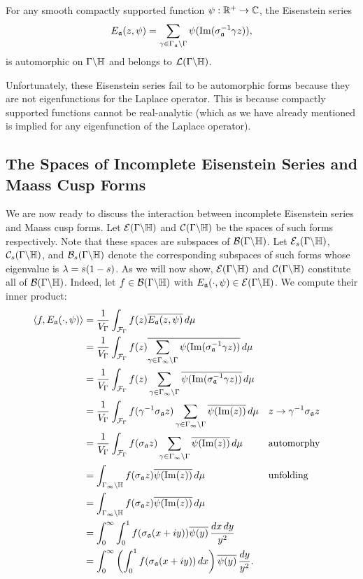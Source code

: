       \begin{theorem}
        For any smooth compactly supported function $\psi:\mathbb{R}^{+} \to \mathbb{C}$, the Eisenstein series
        \[
          E_{\mathfrak{a}}(z,\psi) = \sum_{\gamma \in \Gamma_{\mathfrak{a}}\backslash\Gamma}\psi(\mathrm{Im}(\sigma_{\mathfrak{a}}^{-1}\gamma z)),
        \]
        is automorphic on $\Gamma\backslash\mathbb{H}$ and belongs to $\mathcal{L}(\Gamma\backslash\mathbb{H})$.
      \end{theorem}
      
        Unfortunately, these Eisenstein series fail to be automorphic forms because they are not eigenfunctions for the Laplace operator. This is because compactly supported functions cannot be real-analytic (which as we have already mentioned is implied for any eigenfunction of the Laplace operator).
    \subsection*{The Spaces of Incomplete Eisenstein Series and Maass Cusp Forms}
      We are now ready to discuss the interaction between incomplete Eisenstein series and Maass cusp forms. Let $\mathcal{E}(\Gamma\backslash\mathbb{H})$ and $\mathcal{C}(\Gamma\backslash\mathbb{H})$ be the spaces of such forms respectively. Note that these spaces are subspaces of $\mathcal{B}(\Gamma\backslash\mathbb{H})$. Let $\mathcal{E}_{s}(\Gamma\backslash\mathbb{H})$, $\mathcal{C}_{s}(\Gamma\backslash\mathbb{H})$, and $\mathcal{B}_{s}(\Gamma\backslash\mathbb{H})$ denote the corresponding subspaces of such forms whose eigenvalue is $\lambda = s(1-s)$. As we will now show, $\mathcal{E}(\Gamma\backslash\mathbb{H})$ and $\mathcal{C}(\Gamma\backslash\mathbb{H})$ constitute all of $\mathcal{B}(\Gamma\backslash\mathbb{H})$. Indeed, let $f \in \mathcal{B}(\Gamma\backslash\mathbb{H})$ with $E_{\mathfrak{a}}(\cdot,\psi) \in \mathcal{E}(\Gamma\backslash\mathbb{H})$. We compute their inner product:
      \begin{align*}
        \langle f,E_{\mathfrak{a}}(\cdot,\psi)\rangle &= \frac{1}{V_{\Gamma}}\int_{\mathcal{F}_{\Gamma}}f(z)\overline{E_{\mathfrak{a}}(z,\psi)}\,d\mu \\
        &= \frac{1}{V_{\Gamma}}\int_{\mathcal{F}_{\Gamma}}f(z)\overline{\sum_{\gamma \in \Gamma_{\infty}\backslash\Gamma}\psi(\mathrm{Im}(\sigma_{\mathfrak{a}}^{-1}\gamma z))}\,d\mu \\
        &= \frac{1}{V_{\Gamma}}\int_{\mathcal{F}_{\Gamma}}f(z)\sum_{\gamma \in \Gamma_{\infty}\backslash\Gamma}\overline{\psi(\mathrm{Im}(\sigma_{\mathfrak{a}}^{-1}\gamma z))}\,d\mu \\
        &= \frac{1}{V_{\Gamma}}\int_{\mathcal{F}_{\Gamma}}f(\gamma^{-1}\sigma_{\mathfrak{a}}z)\sum_{\gamma \in \Gamma_{\infty}\backslash\Gamma}\overline{\psi(\mathrm{Im}(z))}\,d\mu && \text{$z \to \gamma^{-1}\sigma_{\mathfrak{a}}z$} \\
        &= \frac{1}{V_{\Gamma}}\int_{\mathcal{F}_{\Gamma}}f(\sigma_{\mathfrak{a}}z)\sum_{\gamma \in \Gamma_{\infty}\backslash\Gamma}\overline{\psi(\mathrm{Im}(z))}\,d\mu  && \text{automorphy} \\
        &= \int_{\Gamma_{\infty}\backslash\mathbb{H}}f(\sigma_{\mathfrak{a}}z)\overline{\psi(\mathrm{Im}(z))}\,d\mu && \text{unfolding} \\
        &= \int_{\Gamma_{\infty}\backslash\mathbb{H}}f(\sigma_{\mathfrak{a}}z)\overline{\psi(\mathrm{Im}(z))}\,d\mu \\
        &= \int_{0}^{\infty}\int_{0}^{1}f(\sigma_{\mathfrak{a}}(x+iy))\overline{\psi(y)}\,\frac{dx\,dy}{y^{2}} \\
        &= \int_{0}^{\infty}\left(\int_{0}^{1}f(\sigma_{\mathfrak{a}}(x+iy))\,dx\right)\overline{\psi(y)}\,\frac{dy}{y^{2}}.
      \end{align*}
